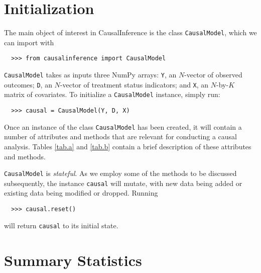\documentclass[12pt]{article}
\theoremstyle{definition}
\theoremstyle{definition}
\theoremstyle{definition}
\theoremstyle{remark}
\begin{document}

\section{Initialization} \label{sec.a}

The main object of interest in CausalInference is the class \texttt{CausalModel}, which we can import with
\begin{verbatim}
  >>> from causalinference import CausalModel
\end{verbatim}
\texttt{CausalModel} takes as inputs three NumPy arrays: \texttt{Y}, an $N$-vector of observed outcomes; \texttt{D}, an $N$-vector of treatment status indicators; and \texttt{X}, an $N$-by-$K$ matrix of covariates. To initialize a \texttt{CausalModel} instance, simply run:
\begin{verbatim}
  >>> causal = CausalModel(Y, D, X)
\end{verbatim}

Once an instance of the class \texttt{CausalModel} has been created, it will contain a number of attributes and methods that are relevant for conducting a causal analysis. Tables \ref{tab.a} and \ref{tab.b} contain a brief description of these attributes and methods.

\texttt{CausalModel} is \textit{stateful}. As we employ some of the methods to be discussed subsequently, the instance \texttt{causal} will mutate, with new data being added or existing data being modified or dropped. Running
\begin{verbatim}
  >>> causal.reset()
\end{verbatim}
will return \texttt{causal} to its initial state.


\section{Summary Statistics} \label{sec.b}
\end{document}
